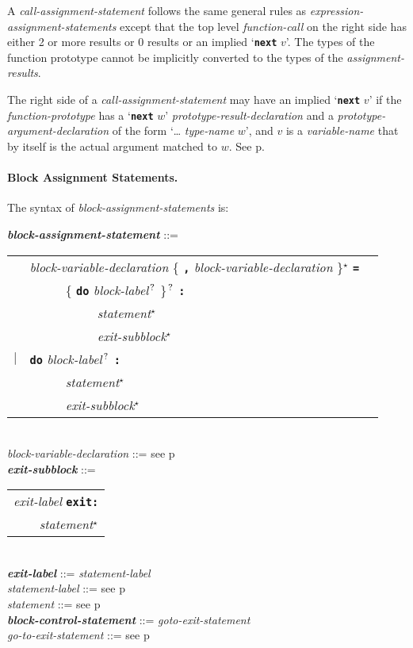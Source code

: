 \documentclass[12pt]{article}
\newcommand{\subsubsubsection}[1]{\paragraph[#1]{#1.}}
\newcommand{\TT}[1]{{\tt \bfseries #1}}
\newcommand{\STAR}{{\Large $^\star$}}
\newcommand{\QMARK}{{$^{\,\mbox{\footnotesize ?}}$}}
\newcommand{\ttkey}[1]{{\tt \bfseries #1}}
\newcommand{\emkey}[1]{{\em \bfseries #1}}
\newcommand{\pagref}[1]{p\pageref{#1}}
\newenvironment{indpar}[1][0.3in]%
	{\begin{list}{}%
		     {\setlength{\itemsep}{0in}%
		      \setlength{\topsep}{0in}%
		      \setlength{\parsep}{1ex}%
		      \setlength{\labelwidth}{#1}%
		      \setlength{\leftmargin}{#1}%
		      \addtolength{\leftmargin}{\labelsep}}%
	 \item}%
	{\end{list}}
\begin{document}
A {\em call-assignment-statement} follows the same general rules
as {\em expression-assignment-state\-ments} except that the top
level {\em function-call} on the right side has either 2 or more
results or 0 results or an implied `\TT{next} $v$'.
The types of the function prototype cannot
be implicitly converted to the types of the {\em assignment-results}.

\label{CALL-NEXT-PROMOTION}
The right side of a {\em call-assignment-statement} may have
an implied `\TT{next} $v$' if the {\em function-prototype} has 
a `\TT{next} $w$' {\em prototype-result-declaration}
and a {\em prototype-argument-declaration} of the
form `\dots{} {\em type-name} $w$', and $v$ is a {\em variable-name}
that by itself is the actual argument matched to $w$.
See \pagref{PROTOTYPE-NEXT-RESULT}.

\subsubsubsection{Block Assignment Statements}
\label{BLOCK-ASSIGNMENT-STATEMENTS}

The syntax of {\em block-assignment-statements} is:

\begin{indpar}
\emkey{block-assignment-statement} ::= \\
\hspace*{0.5in}
    \begin{tabular}[t]{@{}rll}
        & {\em block-variable-declaration}
                \{ \TT{,} {\em block-variable-declaration} \}\STAR{}
		\TT{=} \\
	& ~~~~~ \{ \ttkey{do} {\em block-label}\QMARK{} \}\QMARK{}
		   \TT{:} \\
        & ~~~~~~~~~~ {\em statement}\STAR{} \\
        & ~~~~~~~~~~ {\em exit-subblock}\STAR{} \\
    $|$ & \ttkey{do} {\em block-label}\QMARK{} \TT{:} \\
        & ~~~~~ {\em statement}\STAR{} \\
        & ~~~~~ {\em exit-subblock}\STAR{} \\
    \end{tabular}
\\[0.5ex]
{\em block-variable-declaration} ::=
    see \pagref{BLOCK-VARIABLE-DECLARATION}
\\[0.5ex]
\emkey{exit-subblock}\label{EXIT-SUBBLOCK} ::=
    \begin{tabular}[t]{l}
    {\em exit-label} \ttkey{exit}\TT{:} \\
    \TT{~~~~}{\em statement}\STAR{} \\
    \end{tabular} \\
\emkey{exit-label} ::= {\em statement-label}
\\[0.5ex]
{\em statement-label} ::= see \pagref{STATEMENT-LABEL} \\
{\em statement} ::= see \pagref{STATEMENT} \\
\emkey{block-control-statement}\label{BLOCK-CONTROL-STATEMENT}
	::= {\em goto-exit-statement} \\
{\em go-to-exit-statement} ::= see \pagref{GO-TO-STATEMENT}
\end{indpar}
\end{document}
